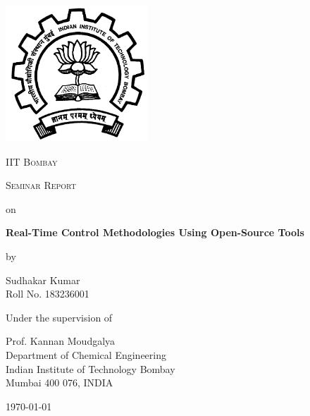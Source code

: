\documentclass[12pt]{report}
\begin{document}


\begin{titlepage}
	\centering
	\includegraphics[width=0.4\textwidth]{images/iitb1.png}\par\vspace{1cm}
	{\scshape\LARGE IIT Bombay \par}
	\vspace{1cm}
	{\scshape\Large Seminar Report\par}
	\vspace{0.5cm}
	{\Large on \par}
	\vspace{0.5cm}
	{\huge\bfseries Real-Time Control Methodologies Using Open-Source Tools\par}
	\vspace{0.5cm}
	{\Large by \par}
	\vspace{0.5cm}
	{\Large Sudhakar Kumar \\ Roll No. 183236001 \par}
	\vfill
	\large{Under the supervision of}\par
	\Large{Prof. Kannan Moudgalya \\ Department of Chemical Engineering \\ Indian Institute of Technology Bombay \\ Mumbai 400 076, INDIA}

	\vfill

	{\large \today\par}
\end{titlepage}
\tableofcontents
\listoffigures
\listoftables
\end{document}
